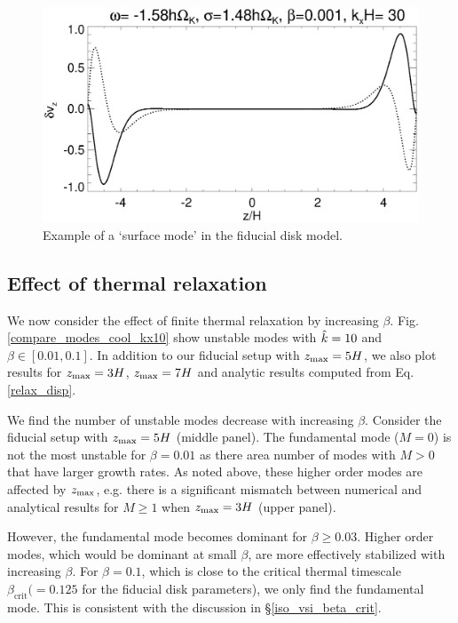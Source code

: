 \begin{figure}
  \includegraphics[width=\linewidth,clip=true,trim=0cm 0cm 0cm
  0cm]{figures/eigenvectorvz_iso_surf}
  \caption{Example of a `surface mode' in the fiducial disk model.
    \label{lowfreq_eigenfunc_surf}
  }
\end{figure}

\subsection{Effect of thermal relaxation}\label{therm_relax_eff}
We now consider the effect of finite thermal relaxation by increasing 
$\beta$. %
Fig. \ref{compare_modes_cool_kx10} show unstable modes with $\hat{k}=10$ 
and $\beta\in[0.01,0.1]$. In addition to our fiducial setup with 
$z_\mathrm{max}=5H$, we also plot results for $z_\mathrm{max}=3H$, $z_\mathrm{max}=7H$ and 
analytic results computed from Eq. \ref{relax_disp}.  %

We find the number of unstable modes decrease with increasing
$\beta$. Consider the fiducial setup with $z_\mathrm{max}=5H$ 
(middle panel). The fundamental mode ($M=0$) is not the most unstable for   
$\beta=0.01$ as there area number of modes with $M>0$ that have larger
growth rates. As noted above, these higher order modes are affected by
$z_\mathrm{max}$, e.g. there is a significant mismatch between numerical and 
analytical results for $M\geq1$ when $z_\mathrm{max}=3H$ (upper panel). 


However, the fundamental mode becomes dominant for $\beta \geq 
0.03$. Higher order modes, which would be dominant at small $\beta$, 
are more effectively stabilized with increasing $\beta$. For 
$\beta=0.1$, which is close to the critical thermal timescale
$\beta_\mathrm{crit} (=0.125$ for the fiducial disk
parameters), we only find the fundamental mode. This is consistent with
the discussion in \S\ref{iso_vsi_beta_crit}.    


